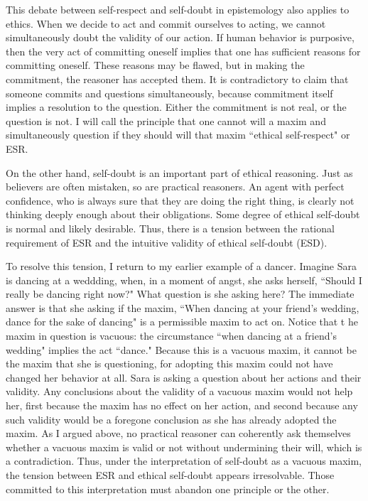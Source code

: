 \begin{isabellebody}
\begin{isamarkuptext}
This debate between self-respect and self-doubt in epistemology also applies to ethics. When we 
decide to act and commit ourselves to acting, we cannot simultaneously doubt the 
validity of our action. If human behavior is purposive, then the very act of committing oneself implies 
that one has sufficient reasons for committing oneself. These reasons may be flawed, but in making the 
commitment, the reasoner has accepted them. It is contradictory to claim that someone commits and questions 
simultaneously, because commitment itself implies a resolution to the question. Either the commitment 
is not real, or the question is not. I will call the principle that 
one cannot will a maxim and simultaneously question if they should will that maxim
``ethical self-respect" or ESR.

On the other hand, self-doubt is an important part of ethical reasoning. Just as believers are often 
mistaken, so are practical reasoners. An agent with perfect confidence, who is always sure that they 
are doing the right thing, is clearly not thinking deeply enough about their obligations. Some degree
of ethical self-doubt is normal and likely desirable. Thus, there is a tension between the rational
requirement of ESR and the intuitive validity of ethical self-doubt (ESD).

To resolve this tension, I return to my earlier example of a dancer. Imagine Sara is dancing at a 
weddding, when, in a moment of angst, she asks herself, ``Should I really be dancing right now?" 
What question is she asking here? The immediate answer is that she asking if the maxim, ``When dancing 
at your friend's wedding, dance for the sake of dancing" is a permissible maxim to act on. Notice that t
he maxim in question is vacuous: the circumstance ``when dancing at a friend's wedding" implies the act 
``dance." Because this is a vacuous maxim, it cannot be the maxim that she is questioning, for adopting 
this maxim could not have changed her behavior at all. Sara is asking a question about her actions and 
their validity. Any conclusions about the validity of a vacuous maxim would not help her, first because 
the maxim has no effect on her action, and second because any such validity would be a foregone conclusion
as she has already adopted the maxim. As 
I argued above, no practical reasoner can coherently ask themselves whether a vacuous maxim is 
valid or not without undermining their will, which is a contradiction. Thus, under 
the interpretation of self-doubt as a vacuous maxim, the tension between ESR and ethical self-doubt 
appears irresolvable. Those committed to this interpretation must abandon one principle or the other.


\end{isamarkuptext}
\end{isabellebody}
